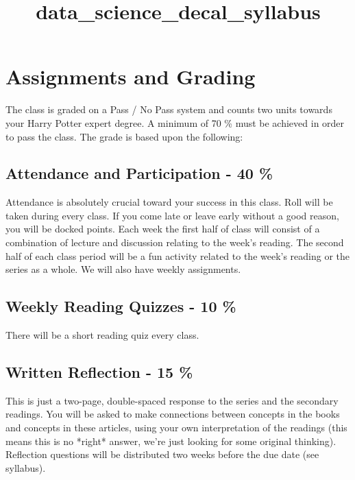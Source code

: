 \documentclass{article}
\title{data_science_decal_syllabus}
\begin{document}
\section*{Assignments and Grading}
	The class is graded on a Pass / No Pass system and counts two units towards your Harry Potter expert degree. A minimum of 70 \% must be achieved in order to pass the class. 
	The grade is based upon the following: 

\subsection*{Attendance and Participation - 40 \%}	
	Attendance is absolutely crucial toward your success in this class. Roll will be taken during every class. If you come late or leave early without a good reason, you will be docked points. Each week the first half of class will consist of a combination of lecture and discussion relating to the week’s reading. The second half of each class period will be a fun activity related to the week’s reading or the series as a whole. We will also have weekly assignments.

\subsection*{Weekly Reading Quizzes - 10 \%}
    There will be a short reading quiz every class.
	
\subsection*{Written Reflection - 15 \%}		
	This is just a two-page, double-spaced response to the series and the secondary readings. You will be asked to make connections between concepts in the books and concepts in these articles, using your own interpretation of the readings (this means this is no *right* answer, we’re just looking for some original thinking). Reflection questions will be distributed two weeks before the due date (see syllabus).
\end{document}
